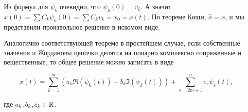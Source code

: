 Из формул для $\psi_k$ очевидно, что $\psi_k(0) = v_k$.
А значит $x(0) = \sum C_k \psi_k(0) = \sum C_k v_k = x_0 = x(t)$.
По теореме Коши, $\hat{x} = x$, и мы представили произвольное решение в искомом виде.

\Endproof


Аналогично соответствующей теореме в простейшем случае, если собственные значения и Жордановы цепочки делятся на попарно комплексно сопряженные и вещественные, то общее решение можно записать в виде

\begin{equation*}
    x(t) = \sum_{k=1}^m \left( a_k \Re \left( \psi_k(t) \right) + b_k \Im \left( \psi_k(t) \right) \right) + \sum_{s=2m+1}^n c_s \psi_s(t),
\end{equation*}

где $a_k, b_k, c_k \in \mathbb{R}$.


